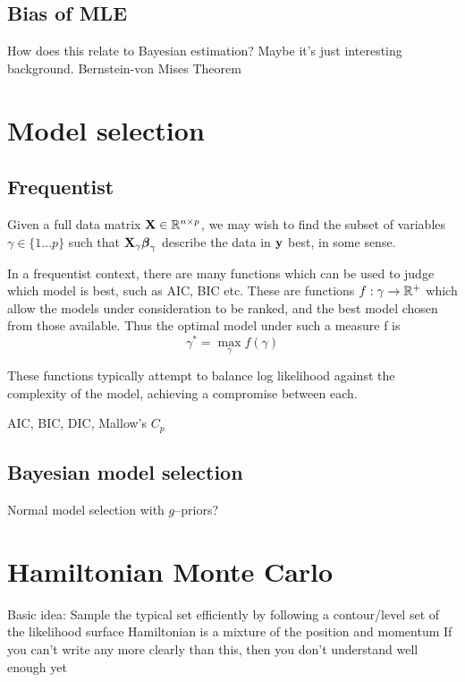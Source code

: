 \documentclass{amsart}[12pt]
\newcommand{\mgc}[1]{{\color{blue}#1}}
\begin{document}
\subsection{Bias of MLE}

How does this relate to Bayesian estimation? Maybe it's just interesting background.
Bernstein-von Mises Theorem

\section{Model selection}

\subsection{Frequentist}

Given a full data matrix ${\bf X} \in {\mathbb{R}}^{n \times p}$, we may wish to find the subset of variables $\gamma \in \{
1 \ldots p \}$ such that ${\bf X}_\gamma {\boldsymbol\beta}_\gamma$ describe the data in ${\bf y}$ best, in some sense.

In a frequentist context, there are many functions which can be used to judge which model is best,
such as AIC, BIC etc. These are functions $f: \gamma \to {\mathbb{R}}^+$ which allow the models under consideration to
be ranked, and the best model chosen from those available. Thus the optimal model under such a measure
f is
$$
\gamma^* = \max_\gamma f(\gamma)
$$

These functions typically attempt to balance log likelihood against the complexity of the model, achieving
a compromise between each.

\mgc{AIC, BIC, DIC, Mallow's $C_p$}

\subsection{Bayesian model selection}

\mgc{Normal model selection with $g$--priors?}

\section{Hamiltonian Monte Carlo}

\cite{Betancourt2017}

Basic idea: Sample the typical set efficiently by following a contour/level set of the likelihood surface
Hamiltonian is a mixture of the position and momentum
If you can't write any more clearly than this, then you don't understand well enough yet


% 

\end{document}
